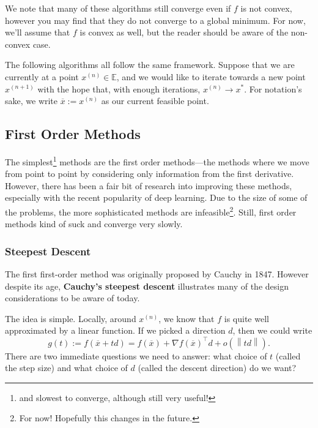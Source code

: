 \documentclass{article}
\numberwithin{equation}{section}
\theoremstyle{definition}
\newcommand{\bE}{\mathbb{E}}
\newcommand{\norm}[1]{\left\lVert#1\right\rVert}
\newcommand{\ox}{\overline{x}}
\begin{document}
We note that many of these algorithms still converge even if $f$ is not convex, however you may find that they do not converge to a global minimum. For now, we'll assume that $f$ is convex as well, but the reader should be aware of the non-convex case.

The following algorithms all follow the same framework. Suppose that we are currently at a point $x^{(n)}\in\bE$, and we would like to iterate towards a new point $x^{(n+1)}$ with the hope that, with enough iterations, $x^{(n)}\to x^*$. For notation's sake, we write $\overline x:=x^{(n)}$ as our current feasible point.
\subsection{First Order Methods}
The simplest\footnote{and slowest to converge, although still very useful!} methods are the first order methods---the methods where we move from point to point by considering only information from the first derivative. However, there has been a fair bit of research into improving these methods, especially with the recent popularity of deep learning. Due to the size of some of the problems, the more sophisticated methods are infeasible\footnote{For now! Hopefully this changes in the future.}. Still, first order methods kind of suck and converge very slowly.
\subsubsection{Steepest Descent}
The first first-order method was originally proposed by Cauchy in 1847. However despite its age, \textbf{Cauchy's steepest descent} illustrates many of the design considerations to be aware of today. 

The idea is simple. Locally, around $x^{(n)}$, we know that $f$ is quite well approximated by a linear function. If we picked a direction $d$, then we could write
\begin{equation}
    g(t):=f(\ox+td)=f(\ox)+\nabla f(\ox)^\top d+o(\norm{td}).
\end{equation}
There are two immediate questions we need to answer: what choice of $t$ (called the step size) and what choice of $d$ (called the descent direction) do we want?
\end{document}
